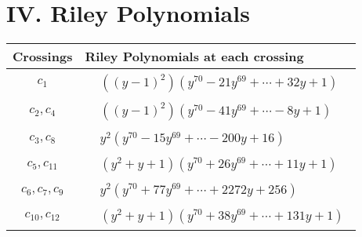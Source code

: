\documentclass[1p]{elsarticle_modified}
\theoremstyle{definition}
\begin{document}
\centering \section*{ IV. Riley Polynomials}
\begin{tabular}{m{50pt}|m{274pt}}
Crossings & \hspace{64pt}Riley Polynomials at each crossing \\
\hline $$\begin{aligned}c_{1}\end{aligned}$$&$\begin{aligned}
&((y-1)^2)(y^{70}-21 y^{69}+\cdots+32 y+1)
\end{aligned}$\\
\hline $$\begin{aligned}c_{2},c_{4}\end{aligned}$$&$\begin{aligned}
&((y-1)^2)(y^{70}-41 y^{69}+\cdots-8 y+1)
\end{aligned}$\\
\hline $$\begin{aligned}c_{3},c_{8}\end{aligned}$$&$\begin{aligned}
&y^2(y^{70}-15 y^{69}+\cdots-200 y+16)
\end{aligned}$\\
\hline $$\begin{aligned}c_{5},c_{11}\end{aligned}$$&$\begin{aligned}
&(y^2+y+1)(y^{70}+26 y^{69}+\cdots+11 y+1)
\end{aligned}$\\
\hline $$\begin{aligned}c_{6},c_{7},c_{9}\end{aligned}$$&$\begin{aligned}
&y^2(y^{70}+77 y^{69}+\cdots+2272 y+256)
\end{aligned}$\\
\hline $$\begin{aligned}c_{10},c_{12}\end{aligned}$$&$\begin{aligned}
&(y^2+y+1)(y^{70}+38 y^{69}+\cdots+131 y+1)
\end{aligned}$\\
\hline
\end{tabular}
\vskip 2pc
\end{document}
